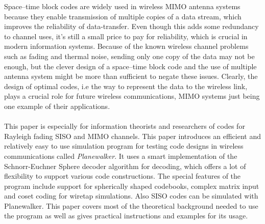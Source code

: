 \documentclass[english,12pt,a4paper,pdftex,sci,utf8]{aaltothesis}
\begin{document}
\makecoverpage



\begin{abstractpage}[english]
Space--time block codes are widely used in wireless MIMO antenna systems because they enable transmission of multiple copies of a data stream, which  improves the reliability of data-transfer. Even though this adds some redundancy to channel uses, it's still a small price to pay for reliability, which is crucial in modern information systems. Because of the known wireless channel problems such as fading and thermal noise, sending only one copy of the data may not be enough, but the clever design of a space--time block code and the use of multiple antenna system might be more than sufficient to negate these issues. Clearly, the design of optimal codes, i.e the way to represent the data to the wireless link, plays a crucial role for future wireless communications, MIMO systems just being one example of their applications. \\ \\
This paper is especially for information theorists and researchers of codes for Rayleigh fading SISO and MIMO channels. This paper introduces an efficient and relatively easy to use simulation program for testing code designs in wireless communications called \emph{Planewalker}. It uses a smart implementation of the Schnorr-Euchner Sphere decoder algorithm for decoding, which offers a lot of flexibility to support various code constructions. The special features of the program include support for spherically shaped codebooks, complex matrix input and coset coding for wiretap simulations. Also SISO codes can be simulated with Planewalker. This paper covers most of the theoretical background needed to use the program as well as gives practical instructions and examples for its usage.
\end{abstractpage}

\end{document}
